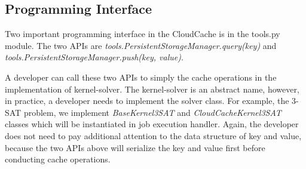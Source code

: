 \subsection{Programming Interface}
Two important programming interface in the CloudCache is in the tools.py module. The two APIs are \emph{tools.PersistentStorageManager.query(key)} and \emph{tools.PersistentStorageManager.push(key, value)}. 

A developer can call these two APIs to simply the cache operations in the implementation of kernel-solver. The kernel-solver is an abstract name, however, in practice, a developer needs to implement the solver class. For example, the 3-SAT problem, we implement \emph{BaseKernel3SAT} and \emph{CloudCacheKernel3SAT} classes which will be instantiated in job execution handler. Again, the developer does not need to pay additional attention to the data structure of key and value, because the two APIs above will serialize the key and value first before conducting cache operations.
